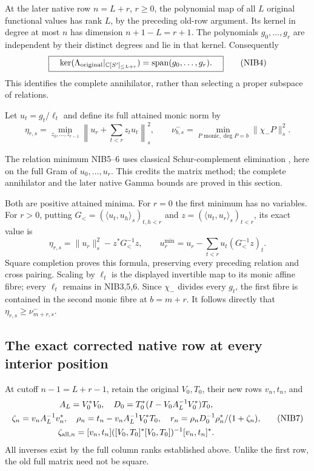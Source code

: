 \documentclass[11pt,a4paper]{article}
\begin{document}
At the later native row $n=L+r$, $r\ge0$, the polynomial map of
all $L$ original functional values has rank $L$, by the preceding
old-row argument. Its kernel in degree at most $n$ has dimension
$n+1-L=r+1$. The polynomials $g_0,\ldots,g_r$ are independent
by their distinct degrees and lie in that kernel. Consequently
\[
 \boxed{\quad
 \ker(\Lambda_{\rm original}|_{\mathbb C[S']_{\le L+r}})
       =\operatorname{span}(g_0,\ldots,g_r).
 \quad}                                                         \tag{NIB4}
\]
This identifies the complete annihilator, rather than selecting a
proper subspace of relations.

Let $u_t=g_t/\ell_t$ and define its full attained monic norm by
\[
 \eta_{r,s}=\min_{z_0,\ldots,z_{r-1}}
       \left\|u_r+\sum_{t<r}z_tu_t\right\|_s^2,
 \qquad
 \nu_{b,s}^-=\min_{P\text{ monic},\deg P=b}\|\chi_-P\|_s^2.
                                                               \tag{NIB5}
\]


The relation minimum NIB5--6 uses classical Schur-complement
elimination \cite[\S2.1, (2.3)--(2.4)]{human:boyd1994}, here on
the full Gram of $u_0,\ldots,u_r$.
This credits the matrix method; the complete annihilator and
the later native Gamma bounds are proved in this section.

Both are positive attained minima. For $r=0$ the first minimum
has no variables. For $r>0$, putting
$G_{<}=(\langle u_t,u_h\rangle_s)_{t,h<r}$ and
$z=(\langle u_t,u_r\rangle_s)_{t<r}$, its exact value is
\[
 \eta_{r,s}=\|u_r\|_s^2-z^*G_<^{-1}z,
 \qquad u_r^{\min}=u_r-\sum_{t<r}u_t(G_<^{-1}z)_t .       \tag{NIB6}
\]
Square completion proves this formula, preserving every preceding
relation and cross pairing. Scaling by $\ell_t$ is the displayed
invertible map to its monic affine fibre; every $\ell_t$ remains
in NIB3,5,6. Since $\chi_-$ divides every $g_t$, the first
fibre is contained in the second monic fibre at $b=m+r$.
It follows directly that $\eta_{r,s}\ge\nu_{m+r,s}^-$.

\subsection{The exact corrected native row at every interior position}
At cutoff $n-1=L+r-1$, retain the original $V_0,T_0$, their new
rows $v_n,t_n$, and
\[
\begin{gathered}
 A_L=V_0^*V_0,\quad
 D_0=T_0^*(I-V_0A_L^{-1}V_0^*)T_0,\\
 \zeta_n=v_nA_L^{-1}v_n^*,\quad
 \rho_n=t_n-v_nA_L^{-1}V_0^*T_0,\quad
 r_n=\rho_nD_0^{-1}\rho_n^*/(1+\zeta_n),\\
 \zeta_{{\rm all},n}=[v_n,t_n]
     ([V_0,T_0]^*[V_0,T_0])^{-1}[v_n,t_n]^*.
\end{gathered}                                                     \tag{NIB7}
\]
All inverses exist by the full column ranks established above.
Unlike the first row, the old full matrix need not be square.
\end{document}
